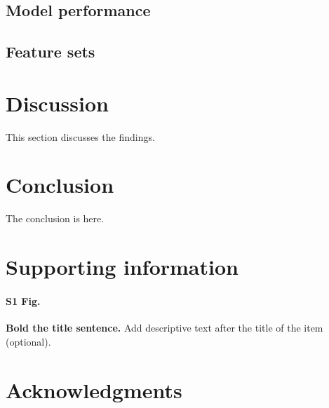 \documentclass[10pt,letterpaper]{article}
\begin{document}
\subsection*{Model performance}

\subsection*{Feature sets}


\section*{Discussion}

This section discusses the findings.

\section*{Conclusion}

The conclusion is here. 

\section*{Supporting information}

\paragraph*{S1 Fig.}
\label{S1_Fig}
{\bf Bold the title sentence.} Add descriptive text after the title of the item (optional).

\section*{Acknowledgments}

\nolinenumbers


\end{document}
